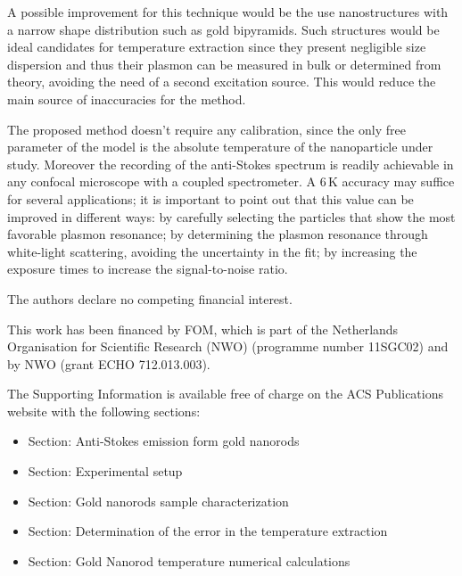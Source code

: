 \documentclass[journal=nalefd,manuscript=letter]{achemso}
\newcommand{\K}{\ensuremath{\,\textrm{K}}}
\begin{document}
A possible improvement for this technique would be the use nanostructures with a
narrow shape distribution such as gold bipyramids\cite{Pelton2009}. Such
structures would be ideal candidates for temperature extraction since they
present negligible size dispersion and thus their plasmon can be measured in
bulk or determined from theory, avoiding the need of a second excitation source.
This would reduce the main source of inaccuracies for the method.

The proposed method doesn't require any calibration, since the only free
parameter of the model is the absolute temperature of the nanoparticle under
study. Moreover the recording of the anti-Stokes spectrum is readily achievable
in any confocal microscope with a coupled spectrometer. A $6\K$ accuracy may
suffice for several applications; it is important to point out that this value
can be improved in different ways: by carefully selecting the particles that
show the most favorable plasmon resonance; by determining the plasmon resonance
through white-light scattering, avoiding the uncertainty in the fit; by
increasing the exposure times to increase the signal-to-noise ratio.

The authors declare no competing financial interest.

\begin{acknowledgement}
This work has been financed by FOM, which is part of the Netherlands Organisation for Scientific Research (NWO)
(programme number 11SGC02) and by NWO (grant ECHO 712.013.003). 
\end{acknowledgement}

\begin{suppinfo}
The Supporting Information is available free of charge on the
ACS Publications website with the following sections:
\begin{itemize}
  \item Section: Anti-Stokes emission form gold nanorods
  \item Section: Experimental setup
	\item Section: Gold nanorods sample characterization
	\item Section: Determination of the error in the temperature extraction
	\item Section: Gold Nanorod temperature numerical calculations
\end{itemize}

\end{suppinfo}
\end{document}
